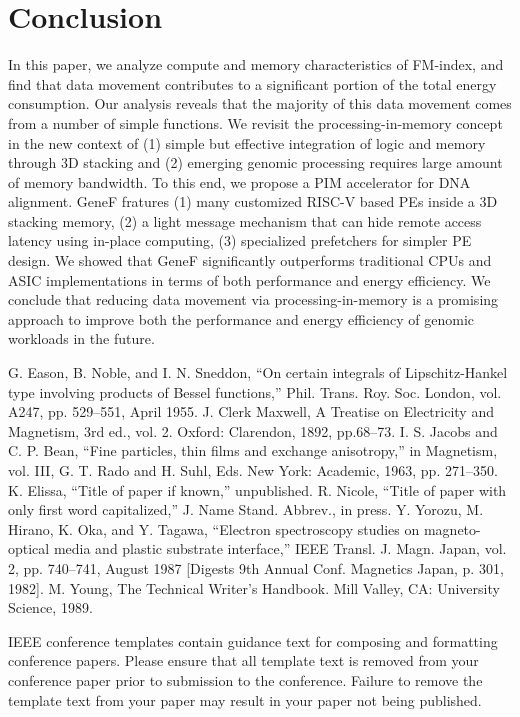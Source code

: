 \documentclass[9pt,conference]{IEEEtran}
\begin{document}
\section{Conclusion}
In this paper, we analyze compute and memory characteristics of FM-index, and find that data movement contributes to a significant portion of the total energy consumption. Our analysis reveals that the majority of this data movement comes from a number of simple functions. We revisit the processing-in-memory concept in the new context of (1) simple but effective integration of logic and memory through 3D stacking and (2) emerging genomic processing requires large amount of memory bandwidth. To this end, we propose a PIM accelerator for DNA alignment. GeneF fratures (1) many customized RISC-V based PEs inside a 3D stacking memory, (2) a light message mechanism that can hide remote access latency using in-place computing, (3) specialized prefetchers for simpler PE design. We showed that GeneF significantly outperforms traditional CPUs and ASIC implementations in terms of both performance and energy efficiency. We conclude that reducing data movement via processing-in-memory is a promising approach to improve both the performance and energy efficiency of genomic workloads in the future.


\begin{thebibliography}{00}
 G. Eason, B. Noble, and I. N. Sneddon, ``On certain integrals of Lipschitz-Hankel type involving products of Bessel functions,'' Phil. Trans. Roy. Soc. London, vol. A247, pp. 529--551, April 1955.
 J. Clerk Maxwell, A Treatise on Electricity and Magnetism, 3rd ed., vol. 2. Oxford: Clarendon, 1892, pp.68--73.
 I. S. Jacobs and C. P. Bean, ``Fine particles, thin films and exchange anisotropy,'' in Magnetism, vol. III, G. T. Rado and H. Suhl, Eds. New York: Academic, 1963, pp. 271--350.
 K. Elissa, ``Title of paper if known,'' unpublished.
 R. Nicole, ``Title of paper with only first word capitalized,'' J. Name Stand. Abbrev., in press.
 Y. Yorozu, M. Hirano, K. Oka, and Y. Tagawa, ``Electron spectroscopy studies on magneto-optical media and plastic substrate interface,'' IEEE Transl. J. Magn. Japan, vol. 2, pp. 740--741, August 1987 [Digests 9th Annual Conf. Magnetics Japan, p. 301, 1982].
 M. Young, The Technical Writer's Handbook. Mill Valley, CA: University Science, 1989.
\end{thebibliography}
\vspace{12pt}
\color{red}
IEEE conference templates contain guidance text for composing and formatting conference papers. Please ensure that all template text is removed from your conference paper prior to submission to the conference. Failure to remove the template text from your paper may result in your paper not being published.
\end{document}
